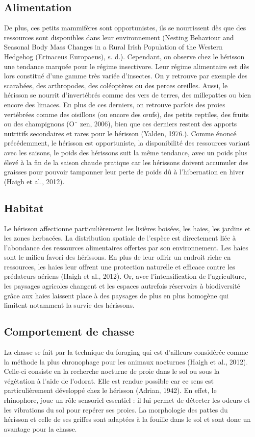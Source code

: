 \documentclass[a4paper,11pt]{article}
\begin{document}
\subsection{Alimentation}
De plus, ces petits mammifères sont opportunistes, ils se nourrissent dès que des ressources sont disponibles dans leur environnement (Nesting Behaviour and Seasonal Body Mass Changes in a Rural Irish Population of the Western Hedgehog (Erinaceus Europaeus), s. d.). Cependant, on observe chez le hérisson une tendance marquée pour le régime insectivore. Leur régime alimentaire est dès lors constitué d’une gamme très variée d’insectes. On y retrouve par exemple des scarabées, des arthropodes, des coléoptères ou des perces oreilles. Aussi, le hérisson se nourrit d’invertébrés comme des vers de terres, des millepattes ou bien encore des limaces. En plus de ces derniers, on retrouve parfois des proies vertébrées comme des oisillons (ou encore des œufs), des petits reptiles, des fruits ou des champignons (O¨ zen, 2006), bien que ces derniers restent des apports nutritifs secondaires et rares pour le hérisson (Yalden, 1976.). Comme énoncé précédemment, le hérisson est opportuniste, la disponibilité des ressources variant avec les saisons, le poids des hérissons suit la même tendance, avec un poids plus élevé à la fin de la saison chaude pratique car les hérissons doivent accumuler des graisses pour pouvoir tamponner leur perte de poids dû à l’hibernation en hiver (Haigh et al., 2012).

\subsection{Habitat}
Le hérisson affectionne particulièrement les lisières boisées, les haies, les jardins et les zones herbacées. La distribution spatiale de l’espèce est directement liée à l’abondance des ressources alimentaires offertes par son environnement. Les haies sont le milieu favori des hérissons. En plus de leur offrir un endroit riche en ressources, les haies leur offrent une protection naturelle et efficace contre les prédateurs aériens (Haigh et al., 2012). Or, avec l’intensification de l’agriculture, les paysages agricoles changent et les espaces autrefois réservoirs à biodiversité grâce aux haies laissent place à des paysages de plus en plus homogène qui limitent notamment la survie des hérissons. 

\subsection{Comportement de chasse}
La chasse se fait par la technique du foraging qui est d’ailleurs considérée comme la méthode la plus chronophage pour les animaux nocturnes (Haigh et al., 2012). Celle-ci consiste en la recherche nocturne de proie dans le sol ou sous la végétation à l’aide de l’odorat. Elle est rendue possible car ce sens est particulièrement développé chez le hérisson (Adrian, 1942). En effet, le rhinophore, joue un rôle sensoriel essentiel : il lui permet de détecter les odeurs et les vibrations du sol pour repérer ses proies. La morphologie des pattes du hérisson et celle de ses griffes sont adaptées à la fouille dans le sol et sont donc un avantage pour la chasse.
\end{document}
